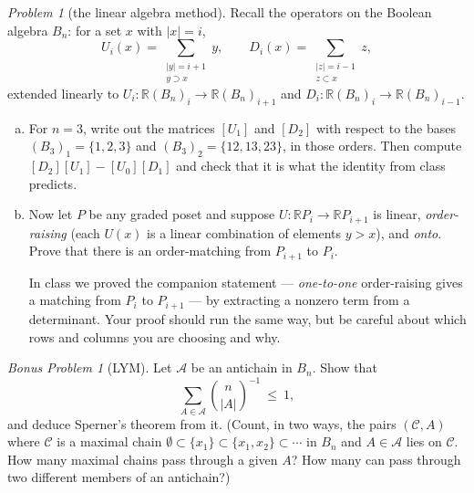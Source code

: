 \documentclass[11pt,twoside]{amsart}
\theoremstyle{plain}
\theoremstyle{remark}
\newtheorem{prob}{Problem}
\newtheorem*{bonus*}{Bonus Problem}
\theoremstyle{definition}
\newcommand{\RR}{\mathbb{R}}
\begin{document}
\begin{prob}[the linear algebra method]
Recall the operators on the Boolean algebra $B_n$: for a set $x$ with $|x|=i$,
\[
U_i(x)=\sum_{\substack{|y|=i+1\\ y\supset x}}y,
\qquad
D_i(x)=\sum_{\substack{|z|=i-1\\ z\subset x}}z,
\]
extended linearly to $U_i\colon\RR(B_n)_i\to\RR(B_n)_{i+1}$ and
$D_i\colon\RR(B_n)_i\to\RR(B_n)_{i-1}$.
\begin{enumerate}[(a)]
\item For $n=3$, write out the matrices $[U_1]$ and $[D_2]$ with respect to the bases
$(B_3)_1=\{1,2,3\}$ and $(B_3)_2=\{12,13,23\}$, in those orders. Then compute
$[D_2][U_1]-[U_0][D_1]$ and check that it is what the identity from class predicts.
\item Now let $P$ be any graded poset and suppose $U\colon\RR P_i\to\RR P_{i+1}$ is linear,
\emph{order-raising} (each $U(x)$ is a linear combination of elements $y>x$), and \emph{onto}.
Prove that there is an order-matching from $P_{i+1}$ to $P_i$.

In class we proved the companion statement --- \emph{one-to-one} order-raising gives a matching
from $P_i$ to $P_{i+1}$ --- by extracting a nonzero term from a determinant. Your proof should
run the same way, but be careful about which rows and columns you are choosing and why.
\end{enumerate}
\end{prob}

\begin{bonus*}[LYM]
Let $\mathcal A$ be an antichain in $B_n$. Show that
\[
\sum_{A\in\mathcal A}\binom{n}{|A|}^{-1}\ \le\ 1,
\]
and deduce Sperner's theorem from it. (Count, in two ways, the pairs $(\mathcal C,A)$ where
$\mathcal C$ is a maximal chain $\emptyset\subset\{x_1\}\subset\{x_1,x_2\}\subset\cdots$ in $B_n$
and $A\in\mathcal A$ lies on $\mathcal C$. How many maximal chains pass through a given $A$? How
many can pass through two different members of an antichain?)
\end{bonus*}
\end{document}
